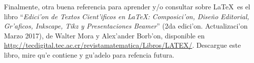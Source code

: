 \documentclass[11pt]{exam}
\begin{document}
\begin{questions}
\item Finalmente, otra buena referencia para aprender y/o consultar sobre \LaTeX\ es el libro ``\textit{Edici'on de Textos Cient'ificos en \LaTeX: Composici'on, Dise\~no Editorial, Gr'aficos, Inkscape, Tikz y Presentaciones Beamer}'' (2da edici'on. Actualizaci'on Marzo 2017), de Walter Mora y Alex'ander Borb'on, disponible en \url{http://tecdigital.tec.ac.cr/revistamatematica/Libros/LATEX/}. Descargue este libro, mire qu'e contiene y gu'adelo para refencia futura.
\end{questions}
\end{document}
